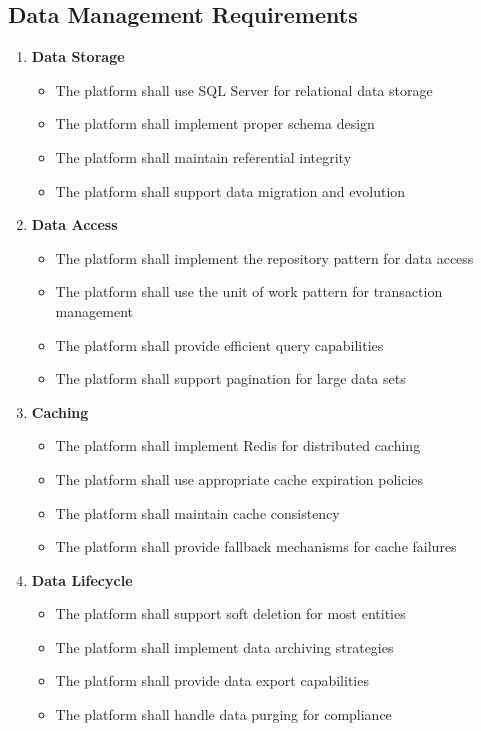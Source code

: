\subsection{Data Management Requirements}

\begin{enumerate}
   \item \textbf{Data Storage}
   \begin{itemize}
      \item The platform shall use SQL Server for relational data storage
      \item The platform shall implement proper schema design
      \item The platform shall maintain referential integrity
      \item The platform shall support data migration and evolution
   \end{itemize}

   \item \textbf{Data Access}
   \begin{itemize}
      \item The platform shall implement the repository pattern for data access
      \item The platform shall use the unit of work pattern for transaction management
      \item The platform shall provide efficient query capabilities
      \item The platform shall support pagination for large data sets
   \end{itemize}

   \item \textbf{Caching}
   \begin{itemize}
      \item The platform shall implement Redis for distributed caching
      \item The platform shall use appropriate cache expiration policies
      \item The platform shall maintain cache consistency
      \item The platform shall provide fallback mechanisms for cache failures
   \end{itemize}

   \item \textbf{Data Lifecycle}
   \begin{itemize}
      \item The platform shall support soft deletion for most entities
      \item The platform shall implement data archiving strategies
      \item The platform shall provide data export capabilities
      \item The platform shall handle data purging for compliance
   \end{itemize}
\end{enumerate}

